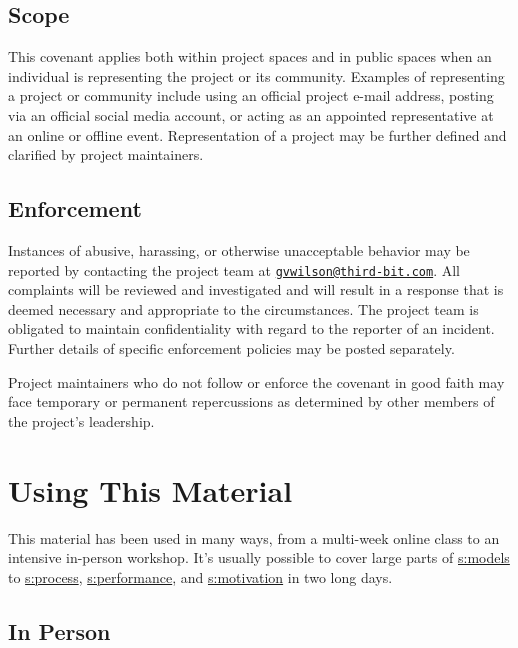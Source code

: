 \subsection{Scope}\label{scope}

This covenant applies both within project spaces and in public spaces
when an individual is representing the project or its community.
Examples of representing a project or community include using an
official project e-mail address, posting via an official social media
account, or acting as an appointed representative at an online or
offline event. Representation of a project may be further defined and
clarified by project maintainers.

\subsection{Enforcement}\label{enforcement}

Instances of abusive, harassing, or otherwise unacceptable behavior
may be reported by contacting the project team at
\href{mailto:gvwilson@third-bit.com}{\nolinkurl{gvwilson@third-bit.com}}. All complaints will be
reviewed and investigated and will result in a response that is deemed
necessary and appropriate to the circumstances. The project team is
obligated to maintain confidentiality with regard to the reporter of
an incident. Further details of specific enforcement policies may be
posted separately.

Project maintainers who do not follow or enforce the covenant in good
faith may face temporary or permanent repercussions as determined by
other members of the project's leadership.

\section{Using This Material}\label{s:joining-using}

This material has been used in many ways, from a multi-week online
class to an intensive in-person workshop. It's usually possible to
cover large parts of \protect\hyperlink{CHAPTER}{s:models} to \protect\hyperlink{CHAPTER}{s:process},
\protect\hyperlink{CHAPTER}{s:performance}, and \protect\hyperlink{CHAPTER}{s:motivation} in two long
days.

\subsection{In Person}\label{in-person}

